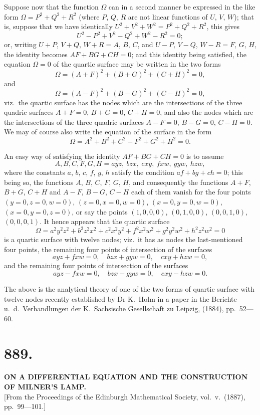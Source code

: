 \documentclass[11pt,a4paper]{article}
\begin{document}
Suppose now that the function $\Omega$ can in a second manner be expressed in the like form $\Omega = P^2 + Q^2 + R^2$ (where $P$, $Q$, $R$ are not linear functions of $U$, $V$, $W$); that is, suppose that we have identically $U^2 + V^2 + W^2 = P^2 + Q^2 + R^2$, this gives
\[
U^2 - P^2 + V^2 - Q^2 + W^2 - R^2 = 0;
\]
or, writing $U+P$, $V+Q$, $W+R = A$, $B$, $C$, and $U-P$, $V-Q$, $W-R = F$, $G$, $H$, the identity becomes $AF + BG + CH = 0$; and this identity being satisfied, the equation $\Omega = 0$ of the quartic surface may be written in the two forms
\[
\Omega = (A+F)^2 + (B+G)^2 + (C+H)^2 = 0,
\]
and
\[
\Omega = (A-F)^2 + (B-G)^2 + (C-H)^2 = 0,
\]
viz.\ the quartic surface has the nodes which are the intersections of the three quadric surfaces $A+F=0$, $B+G=0$, $C+H=0$, and also the nodes which are the intersections of the three quadric surfaces $A-F=0$, $B-G=0$, $C-H=0$. We may of course also write the equation of the surface in the form
\[
\Omega = A^2 + B^2 + C^2 + F^2 + G^2 + H^2 = 0.
\]

An easy way of satisfying the identity $AF+BG+CH=0$ is to assume
\[
A, B, C, F, G, H = ayz,\ bzx,\ cxy,\ fxw,\ gyw,\ hzw,
\]
where the constants $a$, $b$, $c$, $f$, $g$, $h$ satisfy the condition $af + bg + ch = 0$; this being so, the functions $A$, $B$, $C$, $F$, $G$, $H$, and consequently the functions $A+F$, $B+G$, $C+H$ and $A-F$, $B-G$, $C-H$ each of them vanish for the four points $(y=0, z=0, w=0)$, $(z=0, x=0, w=0)$, $(x=0, y=0, w=0)$, $(x=0, y=0, z=0)$, or say the points $(1,0,0,0)$, $(0,1,0,0)$, $(0,0,1,0)$, $(0,0,0,1)$. It hence appears that the quartic surface
\[
\Omega = a^2y^2z^2 + b^2z^2x^2 + c^2x^2y^2 + f^2x^2w^2 + g^2y^2w^2 + h^2z^2w^2 = 0
\]
is a quartic surface with twelve nodes; viz.\ it has as nodes the last-mentioned four points, the remaining four points of intersection of the surfaces
\[
ayz + fxw = 0,\quad bzx + gyw = 0,\quad cxy + hzw = 0,
\]
and the remaining four points of intersection of the surfaces
\[
ayz - fxw = 0,\quad bzx - gyw = 0,\quad cxy - hzw = 0.
\]

The above is the analytical theory of one of the two forms of quartic surface with twelve nodes recently established by Dr K.\ Holm in a paper in the Berichte u.\ d.\ Verhandlungen der K.\ Sachsische Gesellschaft zu Leipzig, (1884), pp.\ 52---60.


\section*{889.}
\begin{center}
{\large\bfseries ON A DIFFERENTIAL EQUATION AND THE CONSTRUCTION OF MILNER'S LAMP.}\\[0.5em]
\small [From the Proceedings of the Edinburgh Mathematical Society, vol.\ v.\ (1887), pp.\ 99---101.]
\end{center}
\end{document}
